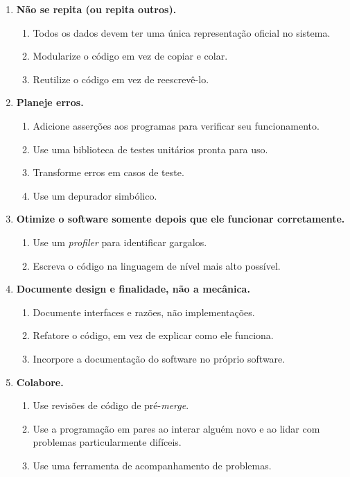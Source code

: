 \begin{tcolorbox}
\begin{enumerate}
\item \textbf{Não se repita (ou repita outros).}
    \begin{enumerate}
        \item Todos os dados devem ter uma única representação oficial no sistema.
        \item Modularize o código em vez de copiar e colar.
        \item Reutilize o código em vez de reescrevê-lo.
    \end{enumerate}

\item \textbf{Planeje erros.}
    \begin{enumerate}
        \item Adicione asserções aos programas para verificar seu funcionamento.
        \item Use uma biblioteca de testes unitários pronta para uso.
        \item Transforme erros em casos de teste.
        \item Use um depurador simbólico.
    \end{enumerate}

\item \textbf{Otimize o software somente depois que ele funcionar corretamente.}
    \begin{enumerate}
        \item Use um \textit{profiler} para identificar gargalos.
        \item Escreva o código na linguagem de nível mais alto possível.
    \end{enumerate}

\item \textbf{Documente design e finalidade, não a mecânica.}
    \begin{enumerate}
        \item Documente interfaces e razões, não implementações.
        \item Refatore o código, em vez de explicar como ele funciona.
        \item Incorpore a documentação do software no próprio software.
    \end{enumerate}

\item \textbf{Colabore.}
    \begin{enumerate}
        \item Use revisões de código de pré-\textit{merge}.
        \item Use a programação em pares ao interar alguém novo e ao lidar com problemas particularmente difíceis.
        \item Use uma ferramenta de acompanhamento de problemas.
    \end{enumerate}
\end{enumerate}
\end{tcolorbox}


